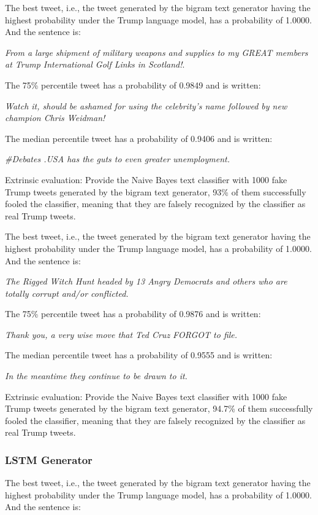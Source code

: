 \documentclass{article}
\begin{document}
The best tweet, i.e., the tweet generated by the bigram text generator having the highest probability under the Trump language model, has a probability of 1.0000. And the sentence is: 

\textit{From a large shipment of military weapons and supplies to my GREAT members at Trump International Golf Links in Scotland!}.

The 75\% percentile tweet has a probability of 0.9849 and is written:

\textit{Watch it, should be ashamed for using the celebrity’s name followed by new champion Chris Weidman!}

The median percentile tweet has a probability of 0.9406 and is written:

\textit{\#Debates .USA has the guts to even greater unemployment.}

Extrinsic evaluation: Provide the Naive Bayes text classifier with 1000 fake Trump tweets generated by the bigram text generator, 93\% of them successfully fooled the classifier, meaning that they are falsely recognized by the classifier as real Trump tweets.

The best tweet, i.e., the tweet generated by the bigram text generator having the highest probability under the Trump language model, has a probability of 1.0000. And the sentence is: 

\textit{The Rigged Witch Hunt headed by 13 Angry Democrats and others who are totally corrupt and/or conflicted.}

The 75\% percentile tweet has a probability of 0.9876 and is written:

\textit{Thank you, a very wise move that Ted Cruz FORGOT to file.}

The median percentile tweet has a probability of 0.9555 and is written:

\textit{In the meantime they continue to be drawn to it.}

Extrinsic evaluation: Provide the Naive Bayes text classifier with 1000 fake Trump tweets generated by the bigram text generator, 94.7\% of them successfully fooled the classifier, meaning that they are falsely recognized by the classifier as real Trump tweets.

\subsubsection{LSTM Generator}
The best tweet, i.e., the tweet generated by the bigram text generator having the highest probability under the Trump language model, has a probability of 1.0000. And the sentence is: 
\end{document}
